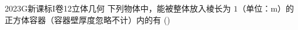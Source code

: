 
\begin{problem}{2023}{G}{新课标I卷}{12}{立体几何}
下列物体中，能被整体放入棱长为 $1$（单位：m）的正方体容器（容器壁厚度忽略不计）内的有 (\hspace{1cm})
\begin{choices}
\end{choices}
\end{problem}

\begin{answer}

\end{answer}

\begin{solutions}

\end{solutions}